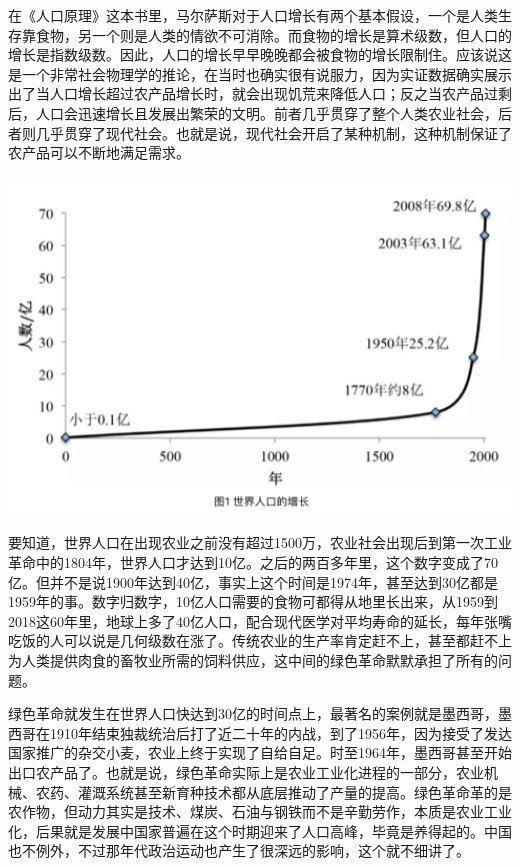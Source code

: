 \documentclass[]{book}
\begin{document}
在《人口原理》这本书里，马尔萨斯对于人口增长有两个基本假设，一个是人类生存靠食物，另一个则是人类的情欲不可消除。而食物的增长是算术级数，但人口的增长是指数级数。因此，人口的增长早早晚晚都会被食物的增长限制住。应该说这是一个非常社会物理学的推论，在当时也确实很有说服力，因为实证数据确实展示出了当人口增长超过农产品增长时，就会出现饥荒来降低人口；反之当农产品过剩后，人口会迅速增长且发展出繁荣的文明。前者几乎贯穿了整个人类农业社会，后者则几乎贯穿了现代社会。也就是说，现代社会开启了某种机制，这种机制保证了农产品可以不断地满足需求。

\includegraphics[width=6.67in]{images/renkou1}

要知道，世界人口在出现农业之前没有超过1500万，农业社会出现后到第一次工业革命中的1804年，世界人口才达到10亿。之后的两百多年里，这个数字变成了70亿。但并不是说1900年达到40亿，事实上这个时间是1974年，甚至达到30亿都是1959年的事。数字归数字，10亿人口需要的食物可都得从地里长出来，从1959到2018这60年里，地球上多了40亿人口，配合现代医学对平均寿命的延长，每年张嘴吃饭的人可以说是几何级数在涨了。传统农业的生产率肯定赶不上，甚至都赶不上为人类提供肉食的畜牧业所需的饲料供应，这中间的绿色革命默默承担了所有的问题。

绿色革命就发生在世界人口快达到30亿的时间点上，最著名的案例就是墨西哥，墨西哥在1910年结束独裁统治后打了近二十年的内战，到了1956年，因为接受了发达国家推广的杂交小麦，农业上终于实现了自给自足。时至1964年，墨西哥甚至开始出口农产品了。也就是说，绿色革命实际上是农业工业化进程的一部分，农业机械、农药、灌溉系统甚至新育种技术都从底层推动了产量的提高。绿色革命革的是农作物，但动力其实是技术、煤炭、石油与钢铁而不是辛勤劳作，本质是农业工业化，后果就是发展中国家普遍在这个时期迎来了人口高峰，毕竟是养得起的。中国也不例外，不过那年代政治运动也产生了很深远的影响，这个就不细讲了。
\end{document}
